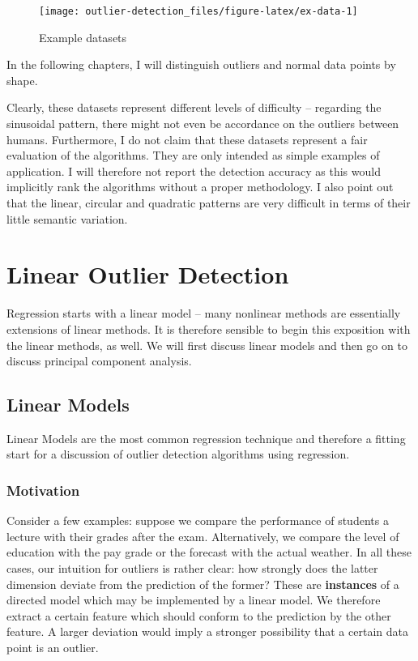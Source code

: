 \documentclass[]{report}
\theoremstyle{definition}
\theoremstyle{definition}
\theoremstyle{definition}
\theoremstyle{remark}
\begin{document}
\begin{figure}
\texttt{[image: outlier-detection\_files/figure-latex/ex-data-1]} \caption{Example datasets}\label{fig:ex-data}
\end{figure}

In the following chapters, I will distinguish outliers and normal data
points by shape.

Clearly, these datasets represent different levels of difficulty --
regarding the sinusoidal pattern, there might not even be accordance on
the outliers between humans. Furthermore, I do not claim that these
datasets represent a fair evaluation of the algorithms. They are only
intended as simple examples of application. I will therefore not report
the detection accuracy as this would implicitly rank the algorithms
without a proper methodology. I also point out that the linear, circular
and quadratic patterns are very difficult in terms of their little
semantic variation.

\hypertarget{linear}{%
\chapter{Linear Outlier Detection}\label{linear}}

Regression starts with a linear model -- many nonlinear methods are
essentially extensions of linear methods. It is therefore sensible to
begin this exposition with the linear methods, as well. We will first
discuss linear models and then go on to discuss principal component
analysis.

\hypertarget{linear-model}{%
\section{Linear Models}\label{linear-model}}

Linear Models are the most common regression technique and therefore a
fitting start for a discussion of outlier detection algorithms using
regression.

\hypertarget{motivation}{%
\subsection{Motivation}\label{motivation}}

Consider a few examples: suppose we compare the performance of students
a lecture with their grades after the exam. Alternatively, we compare
the level of education with the pay grade or the forecast with the
actual weather. In all these cases, our intuition for outliers is rather
clear: how strongly does the latter dimension deviate from the
prediction of the former? These are \textbf{instances} of a directed
model which may be implemented by a linear model. We therefore extract a
certain feature which should conform to the prediction by the other
feature. A larger deviation would imply a stronger possibility that a
certain data point is an outlier.
\end{document}
